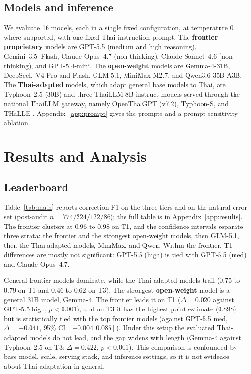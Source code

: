 \documentclass[11pt]{article}
\begin{document}
\subsection{Models and inference}
We evaluate 16 models, each in a single fixed configuration, at temperature 0 where supported,
with one fixed Thai instruction prompt. The \textbf{frontier proprietary} models are GPT-5.5
(medium and high reasoning), Gemini~3.5~Flash, Claude Opus~4.7 (non-thinking), Claude
Sonnet~4.6 (non-thinking), and GPT-5.4-mini. The \textbf{open-weight} models are Gemma-4-31B,
DeepSeek~V4 Pro and Flash, GLM-5.1, MiniMax-M2.7, and Qwen3.6-35B-A3B. The \textbf{Thai-adapted}
models, which adapt general base models to Thai, are Typhoon~2.5 (30B) and three ThaiLLM
8B-instruct models served through the national ThaiLLM gateway, namely OpenThaiGPT (v7.2),
Typhoon-S, and THaLLE \citep{pipatanakul-etal-2024-typhoon2,pipatanakul-etal-2026-typhoons}.
Appendix~\ref{app:prompt} gives the prompts and a prompt-sensitivity ablation.

\section{Results and Analysis}

\subsection{Leaderboard}
\label{sec:leaderboard}
Table~\ref{tab:main} reports correction F1 on the three tiers and on the natural-error set
(post-audit $n = 774 / 224 / 122 / 86$); the full table is in Appendix~\ref{app:results}.
The frontier clusters at 0.96 to 0.98 on T1, and the confidence intervals separate three strata:
the frontier
and the strongest open-weight models, then GLM-5.1, then the Thai-adapted models, MiniMax, and
Qwen. Within the frontier, T1 differences are mostly not significant: GPT-5.5 (high) is tied
with GPT-5.5 (med) and Claude Opus~4.7.

General frontier models dominate, while the Thai-adapted models trail (0.75 to 0.79 on T1 and
0.46 to 0.62 on T3). The strongest \textbf{open-weight} model is a general 31B model,
Gemma-4. The frontier leads it on T1 ($\Delta = 0.020$ against GPT-5.5 high, $p < 0.001$), and
on T3 it has the highest point estimate (0.898) but is statistically tied with the top frontier models
(against GPT-5.5 med, $\Delta = +0.041$, 95\% CI $[-0.004, 0.085]$). Under this setup the
evaluated Thai-adapted models do not lead, and the gap widens with length (Gemma-4 against
Typhoon~2.5 on T3: $\Delta = 0.422$, $p < 0.001$). This comparison is confounded by
base model, scale, serving stack, and inference settings, so it is not evidence about Thai
adaptation in general.
\end{document}
